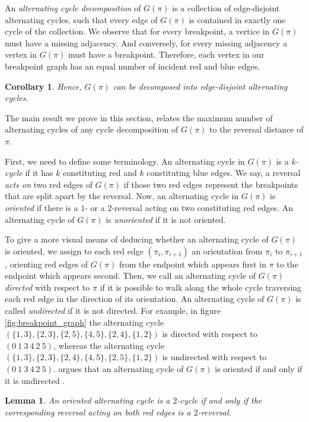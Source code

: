\documentclass[11pt,DIV=11]{scrartcl}
\newtheorem{corollary}{Corollary}[theorem]
\newtheorem{lemma}[theorem]{Lemma}
\theoremstyle{definition}
\theoremstyle{remark}
\begin{document}
An \textit{alternating cycle decomposition} of $G(\pi)$ is a collection of edge-disjoint alternating cycles, such that every edge of $G(\pi)$ is contained in exactly one cycle of the collection. We observe that for every breakpoint, a vertice in $G(\pi)$ must have a missing adjacency. And conversely, for every missing adjacency a vertex in $G(\pi)$ must have a breakpoint. Therefore, each vertex in our breakpoint graph has an equal number of incident red and blue edges.

\begin{corollary}
Hence, $G(\pi)$ can be decomposed into edge-disjoint alternating cycles.
\end{corollary}

The main result we prove in this section, relates the maximum number of alternating cycles of any cycle decomposition of $G(\pi)$ to the reversal distance of $\pi$.

First, we need to define some terminology. An alternating cycle in $G(\pi)$ is a \textit{$k$-cycle} if it has $k$ constituting red and $k$ constituting blue edges. We say, a reversal \textit{acts on} two red edges of $G(\pi)$ if those two red edges represent the breakpoints that are split apart by the reversal. Now, an alternating cycle in $G(\pi)$ is \textit{oriented} if there is a $1$- or a $2$-reversal acting on two constituting red edges. An alternating cycle of $G(\pi)$ is \textit{unoriented} if it is not oriented.

To give a more visual means of deducing whether an alternating cycle of $G(\pi)$ is oriented, we assign to each red edge $(\pi_i, \pi_{i+1})$ an orientation from $\pi_i$ to $\pi_{i+1}$, orienting red edges of $G(\pi)$ from the endpoint which appears first in $\pi$ to the endpoint which appears second. Then, we call an alternating cycle of $G(\pi)$ \textit{directed} with respect to $\pi$ if it is possible to walk along the whole cycle traversing each red edge in the direction of its orientation. An alternating cycle of $G(\pi)$ is called \textit{undirected} if it is not directed. For example, in figure \ref{fig:breakpoint_graph} the alternating cycle $(\{1,3\},\{2,3\},\{2,5\},\{4,5\},\{2,4\},\{1,2\})$ is directed with respect to $(0\ 1\ 3\ 4\ 2\ 5)$, whereas the alternating cycle $(\{1,3\},\{2,3\},\{2,4\},\{4,5\},\{2,5\},\{1,2\})$ is undirected with respect to $(0\ 1\ 3\ 4\ 2\ 5)$. \citeauthor*{Caprara1997} argues that an alternating cycle of $G(\pi)$ is oriented if and only if it is undirected \cite{Caprara1997}.

\begin{lemma}
\label{lem:1}
An oriented alternating cycle is a $2$-cycle if and only if the corresponding reversal acting on both red edges is a $2$-reversal.
\end{lemma}
\end{document}
